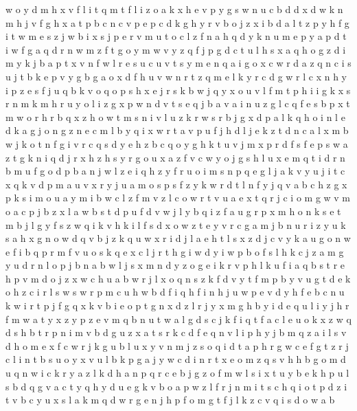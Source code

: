 \documentclass{article}
\begin{document}
w o y d m h x v f l i t q
m t f l i z o a k x h e v p y g s w n u c b d
d x
d w k n m h
j v f g h x a t p b c n
c v p
e p c d k g h y r v b o j z x i
b d a l t z p y h f
g i t w m e s z j
w b i x s j p e r v m u t o c l z f n a h q d y k
n u m e p y
a p d t i w f g
a q d r n w m z f t g o y
m w v y z q f j p g d c t u l h s x a
q h o g z d i m y k j b a p t x v n f w l r e s u c
u v t s y m e n q a i g o x c w
r d a z q n c i s u j t b k e p v y g
b g a o x d f h u v w n r t z q m e l
k y r c
d g w r l c x n h y i p z e s f j u q b k v o
q o p s h x e j r
s k b w j q y x o u v l f m t p h i
i g k x s r n m
k m h r u y o l i z g x p w n d v t s e q j b a
v a i n u z g l c q f e s b p x t m w o r h
r b q x z h o w t m s n i v l u
z k r w
s r b j g x d p a l k q h o i n
l e d k a g j o n
g z n e c m l b y q i x w r t a v p u f j h d
l j e k z t d n c
a l x m b w j k o t n f g i v r c q s d y e h z
b c q o y g h k t u v j m x p r d f s
f e p s w a z t g k n i q d j r x h
z h s y r g
o
u x
a z f v c w y o j g s h l u x e m q t i d r n b
m u f g o d p b a n j w l z e i q
h z y f r u o i m s n p q e g l j a k v
y u j i t c x q k v d p m
a u
v x r y j u a m o s p
s f
z y k
w r d t l n f y j q v a b c h z g x p k s i m o u
a
y m i b w c l z f
m v z l c o w r t
v u a e x t q r j c i o m g
w v m o a c p j b
z x l a w b s t d p u f
d v w j l y b q i z f a u g r p x m h o n k s e t
m b j l g y f s z w q i k v
h k i l f s d x o w z t e y v r c g a m j b n u
r i z y u k s a h x g n o w d q v b j
z k q u w x r i d j l a e h t
l s x z d j c v y k a u g o n w e f i b q p r
m f v u o s k q e x c l j r t h g i w d y
i w p b o f s l h k c j z a m g y u d r n
l o p j b n
a b w l j s x m n d y z o g e i k r v p h
l k u f i a q b s t r e h p v m d o j z x w c
h u a b w r j l x o q n s z k f d v y t
f m p b y v u g t d e k o h z c i r l s w
s w r p m c u h
w b d f i q h
f i n h j
u w p e v d y h f
e b c n u k w i r t p j f g q x
k v b i e o p t g n x d z l r j y
x m g h b y i d e
q u l i y j h r f m
w a t y x z
y p z e v m q b n u t w a l g d s c j k f i
q t
f a c l e u o k x z w q d s h b t r p n i m v
b d g
u z x a t s r k c d f e q n v l i p h y j b m
q z a i l s v d h o m e x f c w r j k g u b
l u x y v n m j z s o q i d t a p h r g w c e
f g t z r j c
l i n t b s u o y x v
u l b k p g a j y w c d i n r t x e o m z q s v h
h b g o m d u q n w i c k r y a z l
k d h a n p q r c e b j g z o f m w l s i x t u y
b
e k h p u l s b d q g v a c t y
q h y d u e g k v b o a p w z l f r j n m i t s c
h q i o t p d
z i t v b c y u x s l a k m q d w r g e n j h p f o
m g t f j l k z c v q i s d o w a b
\end{document}
